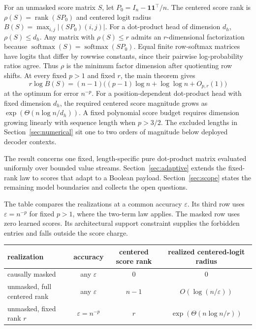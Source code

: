 \documentclass[10pt]{article}
\theoremstyle{definition}
\DeclareMathOperator{\rank}{rank}
\newcommand{\one}{\mathbf 1}
\newcommand{\softmax}{\operatorname{softmax}}
\begin{document}
For an unmasked score matrix \(S\), let
\(P_0=I_n-\one\one^\top/n\).  The centered score rank is
\(\rho(S)=\rank(SP_0)\) and centered logit radius
\(B(S)=\max_{i,j}|(SP_0)(i,j)|\).  For a dot-product head of dimension
\(d_h\), \(\rho(S)\le d_h\).  Any matrix with \(\rho(S)\le r\) admits an
\(r\)-dimensional factorization because
\(\softmax(S)=\softmax(SP_0)\).  Equal finite row-softmax matrices have logits
that differ by rowwise constants, since their pairwise log-probability ratios
agree.  Thus \(\rho\) is the minimum factor dimension after quotienting row
shifts.  At every fixed \(p>1\) and fixed
\(r\), the main theorem gives
\[
 r\log B(S)
 =(n-1)\bigl((p-1)\log n+\log\log n+O_{p,r}(1)\bigr)
\]
at the optimum for error \(n^{-p}\).  For a position-dependent dot-product head with fixed
dimension \(d_h\), the required
centered score magnitude grows as \(\exp(\Theta(n\log n/d_h))\).  A fixed
polynomial score budget requires dimension growing linearly with sequence
length when \(p>3/2\).  The excluded lengths in Section~\ref{sec:numerical}
sit one to two orders of magnitude below deployed decoder contexts.

The result concerns one fixed, length-specific pure dot-product matrix evaluated
uniformly over bounded value streams.
Section~\ref{sec:adaptive} extends the fixed-rank law to scores that adapt
to a Boolean payload.  Section~\ref{sec:scope} states the
remaining model boundaries and collects the open questions.

The table compares the realizations at a common accuracy \(\varepsilon\).  Its
third row uses \(\varepsilon=n^{-p}\) for fixed \(p>1\), where the two-term law
applies.  The masked row uses zero learned scores.  Its architectural support
constraint supplies the forbidden entries and falls outside the score charge.
\begin{center}
\begin{tabular}{lccc}
\toprule
realization & accuracy & centered score rank
 & realized centered-logit radius \\
\midrule
causally masked & any \(\varepsilon\) & \(0\) & \(0\) \\
unmasked, full centered rank & any \(\varepsilon\) & \(n-1\)
 & \(O(\log(n/\varepsilon))\) \\
unmasked, fixed rank \(r\) & \(\varepsilon=n^{-p}\) & \(r\) &
\(\exp(\Theta(n\log n/r))\) \\
\bottomrule
\end{tabular}
\end{center}
\end{document}
